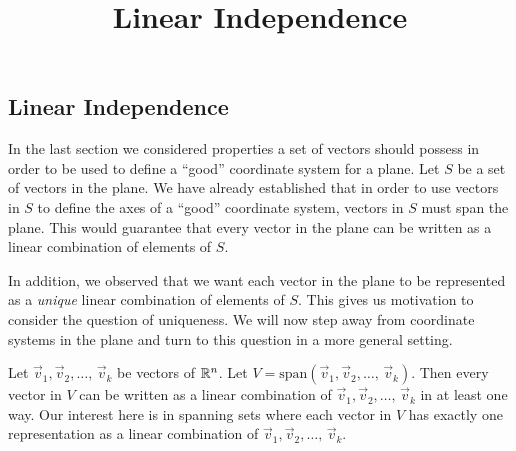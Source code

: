 \documentclass{ximera}
\title{Linear Independence} \license{CC BY-NC-SA 4.0}
\begin{document}
\begin{abstract}
 \end{abstract}
\maketitle

\begin{onlineOnly}
\section*{Linear Independence}
\end{onlineOnly}





In the last section  we considered properties a set of vectors should possess in order to be used to define a ``good'' coordinate system for a plane.  Let $S$ be a set of vectors in the plane.  We have already established that in order to use vectors in $S$ to define the axes of a ``good'' coordinate system, vectors in $S$ must span the plane.  This would guarantee that every vector in the plane can be written as a linear combination of elements of $S$.  

In addition, we observed that we want each vector in the plane to be represented as a \textit{unique} linear combination of elements of $S$.  This gives us motivation to consider the question of uniqueness.  We will now step away from coordinate systems in the plane and turn to this question in a more general setting.

Let $\vec{v}_1, \vec{v}_2,\dots ,\,\vec{v}_k$ be vectors of $\mathbb{R}^n$.  Let $V=\text{span}(\vec{v}_1, \vec{v}_2,\dots ,\,\vec{v}_k)$.  Then every vector in $V$ can be written as a linear combination of $\vec{v}_1, \vec{v}_2,\dots ,\,\vec{v}_k$ in at least one way.  Our interest here is in spanning sets where each vector in $V$ has exactly one representation as a linear combination of $\vec{v}_1, \vec{v}_2,\dots ,\,\vec{v}_k$.
\end{document}
